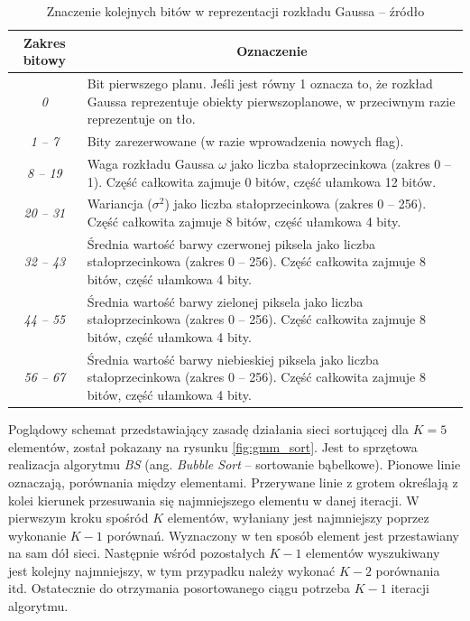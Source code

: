 	\begin{table}[h]
		\centering
		\begin{threeparttable}
			\caption{Znaczenie kolejnych bitów w reprezentacji rozkładu Gaussa -- źródło \cite{piszczek_15}}
			\label{tab:gmm_ram_model}
	
			\begin{tabular}{| c | m{12.5cm} |}  
			\hline
			\textbf{Zakres bitowy} & \multicolumn{1}{c|}{\textbf{Oznaczenie}} \\
			\hline
			\textit{0} & Bit pierwszego planu. Jeśli jest równy 1 oznacza to, że rozkład Gaussa reprezentuje obiekty pierwszoplanowe, w przeciwnym razie reprezentuje on tło. \\
			\hline
			\textit{1 -- 7} & Bity zarezerwowane (w razie wprowadzenia nowych flag). \\
			\hline
	        \textit{8 -- 19} & Waga rozkładu Gaussa $\omega$ jako liczba stałoprzecinkowa (zakres 0 -- 1). Część całkowita zajmuje 0 bitów, część ułamkowa 12 bitów. \\
		    \hline
		    \textit{20 -- 31} & Wariancja ($\sigma^2$) jako liczba stałoprzecinkowa (zakres 0 -- 256). Część całkowita zajmuje 8 bitów, część ułamkowa 4 bity. \\
		    \hline
		    \textit{32 -- 43} & Średnia wartość barwy czerwonej piksela jako liczba stałoprzecinkowa (zakres 0 -- 256). Część całkowita zajmuje 8 bitów, część ułamkowa 4 bity. \\
	        \hline
	        \textit{44 -- 55} & Średnia wartość barwy zielonej piksela jako liczba stałoprzecinkowa (zakres 0 -- 256). Część całkowita zajmuje 8 bitów, część ułamkowa 4 bity. \\
	        \hline
	        \textit{56 -- 67} & Średnia wartość barwy niebieskiej piksela jako liczba stałoprzecinkowa (zakres 0 -- 256). Część całkowita zajmuje 8 bitów, część ułamkowa 4 bity. \\
	        \hline
			\end{tabular}				
		\end{threeparttable}
	\end{table}

Poglądowy schemat przedstawiający zasadę działania sieci sortującej dla $K=5$ elementów, został pokazany na rysunku \ref{fig:gmm_sort}. 
Jest to sprzętowa realizacja algorytmu \textit{BS} (ang. \textit{Bubble Sort} -- sortowanie bąbelkowe). 
Pionowe linie oznaczają, porównania między elementami. 
Przerywane linie z grotem określają z kolei kierunek przesuwania się najmniejszego elementu w danej iteracji. 
W pierwszym kroku spośród $K$ elementów, wyłaniany jest najmniejszy poprzez wykonanie $K-1$ porównań. 
Wyznaczony w ten sposób element jest przestawiany na sam dół sieci. 
Następnie wśród pozostałych $K-1$ elementów wyszukiwany jest kolejny najmniejszy, w tym przypadku należy wykonać $K-2$ porównania itd. 
Ostatecznie do otrzymania posortowanego ciągu potrzeba $K-1$ iteracji algorytmu.  
	
